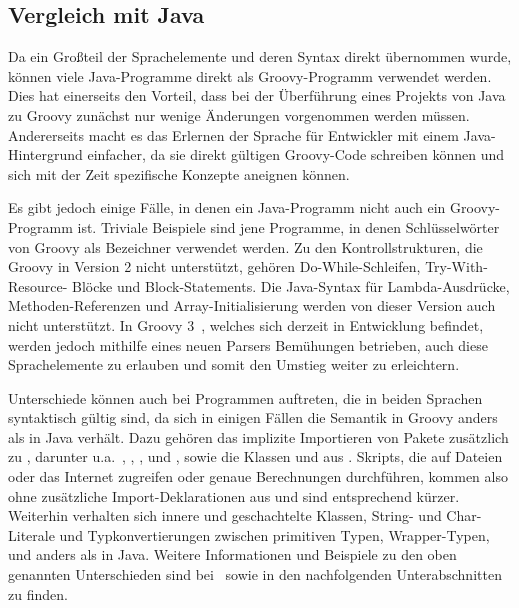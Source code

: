 \documentclass[a4paper]{article}
\begin{document}
\subsection{Vergleich mit Java}\label{subsec:vergleichMitJava}

Da ein Großteil der Sprachelemente und deren Syntax direkt übernommen wurde, können viele Java-Programme direkt als Groovy-Programm verwendet werden.
Dies hat einerseits den Vorteil, dass bei der Überführung eines Projekts von Java zu Groovy zunächst nur wenige Änderungen vorgenommen werden müssen.
Andererseits macht es das Erlernen der Sprache für Entwickler mit einem Java-Hintergrund einfacher, da sie direkt gültigen Groovy-Code schreiben können und sich mit der Zeit spezifische Konzepte aneignen können.

Es gibt jedoch einige Fälle, in denen ein Java-Programm nicht auch ein Groovy-Programm ist.
Triviale Beispiele sind jene Programme, in denen Schlüsselwörter von Groovy als Bezeichner verwendet werden.
Zu den Kontrollstrukturen, die Groovy in Version 2 nicht unterstützt, gehören Do-While-Schleifen, Try-With-Resource- Blöcke und Block-Statements.
Die Java-Syntax für Lambda-Ausdrücke, Methoden-Referenzen und Array-Initialisierung werden von dieser Version auch nicht unterstützt.
In Groovy 3~\cite{groovy-lang:release3}, welches sich derzeit in Entwicklung befindet, werden jedoch mithilfe eines neuen Parsers Bemühungen betrieben, auch diese Sprachelemente zu erlauben und somit den Umstieg weiter zu erleichtern.

Unterschiede können auch bei Programmen auftreten, die in beiden Sprachen syntaktisch gültig sind, da sich in einigen Fällen die Semantik in Groovy anders als in Java verhält.
Dazu gehören das implizite Importieren von Pakete zusätzlich zu , darunter u.a.~, , ,  und , sowie die Klassen  und  aus .
Skripts, die auf Dateien oder das Internet zugreifen oder genaue Berechnungen durchführen, kommen also ohne zusätzliche Import-Deklarationen aus und sind entsprechend kürzer.
Weiterhin verhalten sich innere und geschachtelte Klassen, String- und Char-Literale und Typkonvertierungen zwischen primitiven Typen, Wrapper-Typen,  und  anders als in Java.
Weitere Informationen und Beispiele zu den oben genannten Unterschieden sind bei~\cite{groovy-lang:differences} sowie in den nachfolgenden Unterabschnitten zu finden.
\end{document}
